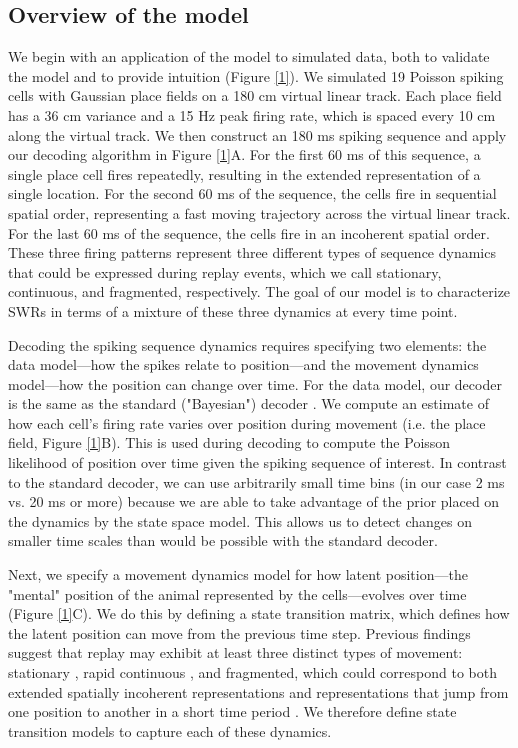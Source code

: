 \documentclass[times, twoside]{zHenriquesLab-StyleBioRxiv}
\begin{document}
\subsection*{Overview of the model}
We begin with an application of the model to simulated data, both to validate the model and to provide intuition (Figure \ref{1}). We simulated 19 Poisson spiking cells with Gaussian place fields on a 180 cm virtual linear track. Each place field has a 36 cm variance and a 15 Hz peak firing rate, which is spaced every 10 cm along the virtual track. We then construct an 180 ms spiking sequence and apply our decoding algorithm in Figure \ref{1}A. For the first 60 ms of this sequence, a single place cell fires repeatedly, resulting in the extended representation of a single location. For the second 60 ms of the sequence, the cells fire in sequential spatial order, representing a fast moving trajectory across the virtual linear track. For the last 60 ms of the sequence, the cells fire in an incoherent spatial order. These three firing patterns represent three different types of sequence dynamics that could be expressed during replay events, which we call stationary, continuous, and fragmented, respectively. The goal of our model is to characterize SWRs in terms of a mixture of these three dynamics at every time point.

Decoding the spiking sequence dynamics requires specifying two elements: the data model---how the spikes relate to position---and the movement dynamics model---how the position can change over time. For the data model, our decoder is the same as the standard ("Bayesian") decoder \cite{DavidsonHippocampalReplayExtended2009, PfeifferAutoassociativedynamicsgeneration2015, StellaHippocampalReactivationRandom2019}. We compute an estimate of how each cell's firing rate varies over position during movement (i.e. the place field, Figure \ref{1}B). This is used during decoding to compute the Poisson likelihood of position over time given the spiking sequence of interest. In contrast to the standard decoder, we can use arbitrarily small time bins (in our case 2 ms vs. 20 ms or more) because we are able to take advantage of the prior placed on the dynamics by the state space model. This allows us to detect changes on smaller time scales than would be possible with the standard decoder.

Next, we specify a movement dynamics model for how latent position---the "mental" position of the animal represented by the cells---evolves over time (Figure \ref{1}C). We do this by defining a state transition matrix, which defines how the latent position can move from the previous time step. Previous findings suggest that replay may exhibit at least three distinct types of movement: stationary \cite{JaiDistincthippocampalcorticalmemory2017, FarooqEmergencepreconfiguredplastic2019}, rapid continuous \cite{DavidsonHippocampalReplayExtended2009}, and fragmented, which could correspond to both extended spatially incoherent representations and representations that jump from one position to another in a short time period \cite{PfeifferAutoassociativedynamicsgeneration2015}. We therefore define state transition models to capture each of these dynamics.
\end{document}
